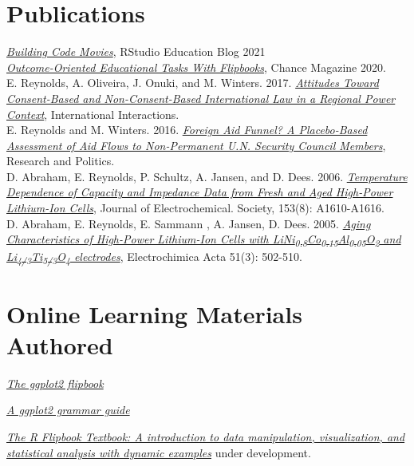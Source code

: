 \documentclass[margin, 10pt]{CVStyleTemplate}\usepackage[]{graphicx}\usepackage[]{color}
\begin{document}
\begin{resume}
\section{Publications}

\emph{\href{https://www.rstudio.com/blog/building-code-movies-with-flipbookr/}{Building Code Movies}}, RStudio Education Blog 2021\\[6pt]
\emph{\href{https://scholar.google.com/citations?view_op=view_citation&hl=de&user=VfkVW3sAAAAJ&citation_for_view=VfkVW3sAAAAJ:EUQCXRtRnyEC}{Outcome-Oriented Educational Tasks With Flipbooks}}, Chance Magazine 2020. \\[6pt]
E. Reynolds, A. Oliveira, J. Onuki,
 and M. Winters. 2017. \emph{\href{http://www.tandfonline.com/doi/abs/10.1080/03050629.2018.1408012}{Attitudes Toward Consent-Based and Non-Consent-Based International Law in a Regional Power Context}}, International Interactions.\\[6pt]
E. Reynolds and M. Winters. 2016. \emph{\href{http://rap.sagepub.com/content/3/1/2053168015626167}{Foreign Aid Funnel? A Placebo-Based Assessment of Aid Flows to Non-Permanent U.N. Security Council Members}}, Research and Politics. \\[6pt]%
D. Abraham, E. Reynolds, P. Schultz, A. Jansen, and D. Dees. 2006. \emph{\href{http://jes.ecsdl.org/content/153/8/A1610.abstract}{Temperature Dependence of Capacity and Impedance Data from Fresh and Aged High-Power Lithium-Ion Cells}}, Journal of Electrochemical. Society, 153(8): A1610-A1616. \\[6pt]%
D. Abraham, E. Reynolds, E. Sammann , A. Jansen,  D. Dees. 2005. \emph{\href{http://www.sciencedirect.com/science/article/pii/S0013468605004433}{Aging Characteristics of High-Power Lithium-Ion Cells with LiNi\textsubscript{0.8}Co\textsubscript{0.15}Al\textsubscript{0.05}O\textsubscript{2} and Li\textsubscript{4/3}Ti\textsubscript{5/3}O\textsubscript{4} electrodes}}, Electrochimica Acta 51(3): 502-510.%

\section{Online Learning Materials Authored}

\emph{\href{https://evamaerey.github.io/ggplot_flipbook/ggplot_flipbook_xaringan.html}{The ggplot2 flipbook}}

\emph{\href{https://evamaerey.github.io/ggplot2_grammar_guide/about}{A ggplot2 grammar guide}}

\emph{\href{https://evamaerey.github.io/flipbooks/textbook}{The R Flipbook Textbook: A introduction to data manipulation, visualization, and statistical analysis with dynamic examples}} under development.



\end{resume}
\end{document}
